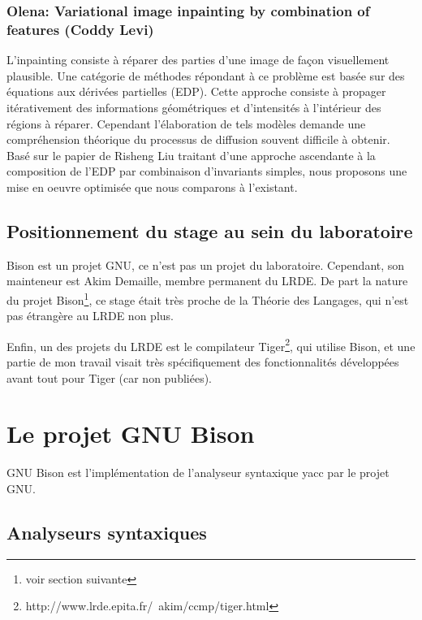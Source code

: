 \documentclass[a4paper,11pt,twoside,final]{article}
\begin{document}
  \subsubsection*{Olena: Variational image inpainting by combination of features
  (Coddy Levi)}

  L'inpainting consiste à réparer des parties d'une image de façon visuellement
  plausible. Une catégorie de méthodes répondant à ce problème est basée sur
  des équations aux dérivées partielles (EDP). Cette approche consiste à
  propager itérativement des informations géométriques et d'intensités à
  l'intérieur des régions à réparer. Cependant l'élaboration de tels modèles
  demande une compréhension théorique du processus de diffusion souvent
  difficile à obtenir. Basé sur le papier de Risheng Liu traitant d'une
  approche ascendante à la composition de l'EDP par combinaison d'invariants
  simples, nous proposons une mise en oeuvre optimisée que nous comparons à
  l'existant.

  \subsection{Positionnement du stage au sein du laboratoire}

  Bison est un projet GNU, ce n'est pas un projet du laboratoire. Cependant,
  son mainteneur est Akim Demaille, membre permanent du LRDE\@. De part la
  nature du projet Bison\footnote{voir section suivante}, ce stage était très
  proche de la Théorie des Langages, qui n'est pas étrangère au LRDE non plus.

  Enfin, un des projets du LRDE est le compilateur Tiger\footnote{%
  http://www.lrde.epita.fr/~akim/ccmp/tiger.html}, qui utilise Bison, et
  une partie de mon travail visait très spécifiquement des fonctionnalités
  développées avant tout pour Tiger (car non publiées).

  \cleardoublepage

  \section{Le projet GNU Bison}

GNU Bison est l'implémentation de l'analyseur syntaxique yacc par le projet GNU.

  \subsection{Analyseurs syntaxiques}
\end{document}
